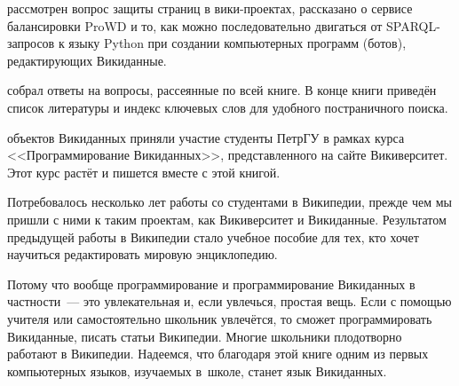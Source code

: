 рассмотрен вопрос защиты страниц в вики-проектах, 
рассказано о сервисе балансировки ProWD 
 и то, как можно последовательно двигаться от SPARQL-запросов 
к языку Python при создании компьютерных программ (ботов), редактирующих Викиданные. 


собрал ответы на вопросы, рассеянные по всей книге. 
В конце книги приведён список литературы 
и индекс ключевых слов для удобного постраничного поиска.

 объектов Викиданных приняли участие студенты ПетрГУ в рамках курса <<Программирование Викиданных>>, 
представленного на сайте Викиверситет. 
Этот курс растёт и пишется вместе с этой книгой. 

Потребовалось несколько лет работы со студентами в Википедии, прежде чем мы пришли с ними к таким проектам, 
как Викиверситет и Викиданные. 
Результатом предыдущей работы в Википедии стало учебное пособие для тех, 
кто хочет научиться редактировать мировую энциклопедию\autocite{Krizhanovsky2015}.



Потому что вообще программирование и программирование Викиданных в частности~--- это 
увлекательная и, если увлечься, простая вещь. 
Если с помощью учителя или самостоятельно школьник увлечётся, 
то сможет программировать Викиданные, писать статьи Википедии. 
Многие школьники плодотворно работают в Википедии. 
Надеемся, что благодаря этой книге одним из первых компьютерных языков, 
изучаемых в~школе, станет язык Викиданных.

